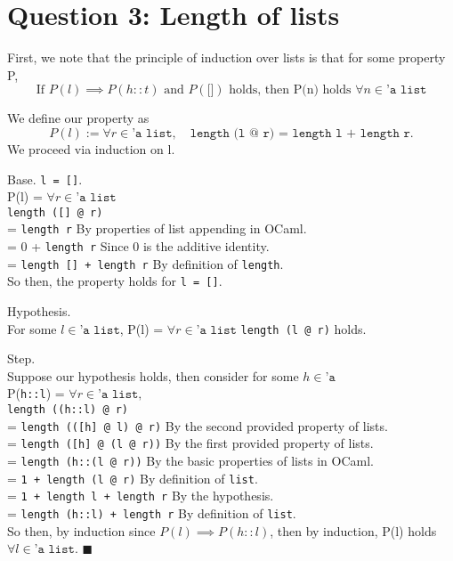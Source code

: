 \documentclass{article}
\begin{document}
\newpage




\section{Question 3: Length of lists}
\noindent
First, we note that the principle of induction over lists is that for some property P,
\[ \text{If } P(l) \implies P(h::t) \text{ and } P(\texttt{[]}) \text{ holds, then P(n) holds } \forall n \in \texttt{'a list} \]

\noindent
We define our property as
\[ P(l) := \forall r \in \texttt{'a list}, \quad \texttt{length (l @ r) = length l + length r}. \]
We proceed via induction on l.

\bigskip

\noindent
Base. \texttt{l = []}. \\
\indent P(l) = $\forall r \in \texttt{'a list}$ \\
\indent \texttt{length ([] @ r)} \\
\indent = \texttt{length r} \qquad By properties of list appending in OCaml. \\
\indent = 0 + \texttt{length r} \qquad Since 0 is the additive identity. \\
\indent = \texttt{length [] + length r} \qquad By definition of \texttt{length}. \\
\noindent So then, the property holds for \texttt{l = []}.

\bigskip

\noindent
Hypothesis. \\
\indent For some $l \in \texttt{'a list}$, P(l) = $\forall r \in \texttt{'a list}$ \quad \texttt{length (l @ r)} holds.

\bigskip

\noindent
Step. \\
Suppose our hypothesis holds, then consider for some $h \in \texttt{'a}$ \\
\indent P(\texttt{h::l}) = $\forall r \in \texttt{'a list},$ \\
\indent \texttt{length ((h::l) @ r)} \\
\indent = \texttt{length (([h] @ l) @ r)} \qquad By the second provided property of lists. \\
\indent = \texttt{length ([h] @ (l @ r))} \qquad By the first provided property of lists. \\
\indent = \texttt{length (h::(l @ r))} \qquad By the basic properties of lists in OCaml. \\
\indent = \texttt{1 + length (l @ r)} \qquad By definition of \texttt{list}. \\
\indent = \texttt{1 + length l + length r} \qquad By the hypothesis. \\
\indent = \texttt{length (h::l) + length r} \qquad By definition of \texttt{list}. \\
\noindent So then, by induction since $P(l) \implies P(h::l)$, then by induction, P(l)
holds $\forall l \in \texttt{'a list}$. $\blacksquare$
\end{document}
